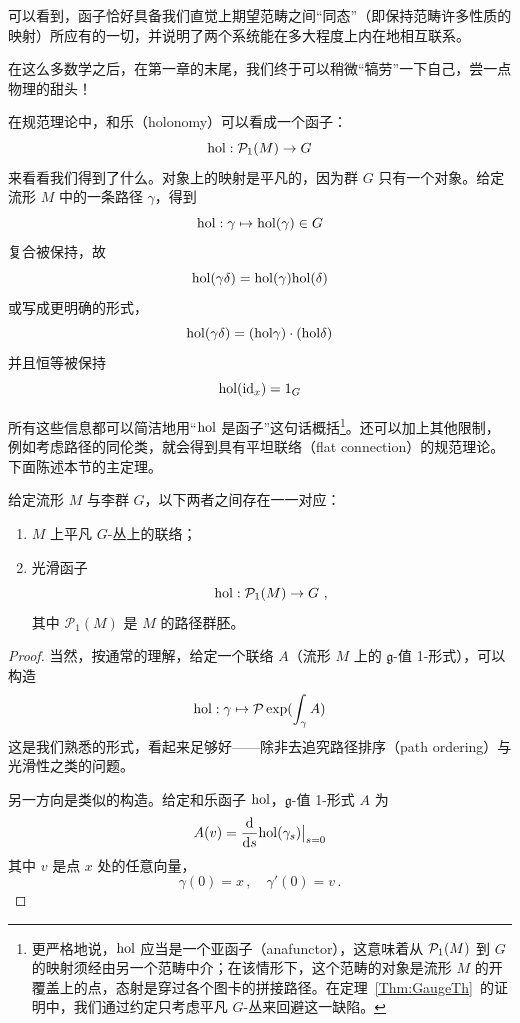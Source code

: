 可以看到，函子恰好具备我们直觉上期望范畴之间“同态”（即保持范畴许多性质的映射）所应有的一切，并说明了两个系统能在多大程度上内在地相互联系。

在这么多数学之后，在第一章的末尾，我们终于可以稍微“犒劳”一下自己，尝一点物理的甜头！

\begin{example}\label{Eg:GT}
在规范理论中，和乐（holonomy）可以看成一个函子：
\[ {\rm hol}: \mathcal{P}_1(M)\to G \]
来看看我们得到了什么。对象上的映射是平凡的，因为群 $G$ 只有一个对象。给定流形 $M$ 中的一条路径 $\gamma$，得到
\[ {\rm hol}: \gamma \mapsto {\rm hol}(\gamma)\in G \]
复合被保持，故
\[ {\rm hol}(\gamma \delta) =  {\rm hol}(\gamma)  {\rm hol}(\delta)  \]
或写成更明确的形式，
\[ {\rm hol}({\gamma\delta}) = ({\rm hol}{\gamma})\cdot ({\rm hol}{\delta}) \]
并且恒等被保持
\[ {\rm hol}({\rm id}_x) = 1_G  \]

所有这些信息都可以简洁地用“${\rm hol}$ 是函子”这句话概括\footnote{更严格地说，${\rm hol}$ 应当是一个亚函子（anafunctor），这意味着从 ${\cal P}_1(M)$ 到 $G$ 的映射须经由另一个范畴中介；在该情形下，这个范畴的对象是流形 $M$ 的开覆盖上的点，态射是穿过各个图卡的拼接路径。在定理~\ref{Thm:GaugeTh}~的证明中，我们通过约定只考虑平凡 $G$-丛来回避这一缺陷。}。还可以加上其他限制，例如考虑路径的同伦类，就会得到具有平坦联络（flat connection）的规范理论。
下面陈述本节的主定理。

\begin{theorem}\label{Thm:GaugeTh}
给定流形 $M$ 与李群 $G$，以下两者之间存在一一对应：
\begin{enumerate}
    \item $M$ 上平凡 $G$-丛上的联络；
    \item 光滑函子
    \[ {\rm hol}: \mathcal{P}_1(M)\to G \ ,  \]
    其中 $\mathcal{P}_1(M)$ 是 $M$ 的路径群胚。
\end{enumerate}
\end{theorem}

\begin{proof}
当然，按通常的理解，给定一个联络 $A$（流形 $M$ 上的 $\mathfrak{g}$-值 1-形式），可以构造
\[ {\rm hol}: \gamma \mapsto \mathcal{P}\exp(\int_\gamma A) \]
这是我们熟悉的形式，看起来足够好——除非去追究路径排序（path ordering）与光滑性之类的问题。

另一方向是类似的构造。给定和乐函子 ${\rm hol}$，$\mathfrak{g}$-值 1-形式 $A$ 为
\[ A(v) = \frac{\rm d}{{\rm d}s} {\rm hol}(\gamma_s)\big|_{s=0}  \]
其中 $v$ 是点 $x$ 处的任意向量，
\[ \gamma (0) = x\,, \quad \gamma'(0) = v\,. \]
\end{proof}
\end{example}

